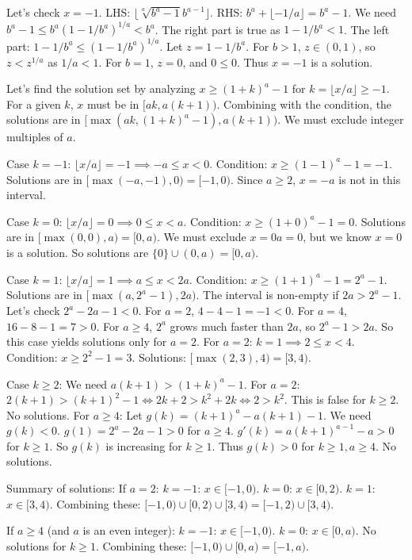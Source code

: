\documentclass[12pt,a4paper]{article}
\theoremstyle{definition}
\begin{document}
    Let's check $x=-1$. LHS: $\lfloor \sqrt[a]{b^a-1} b^{a-1} \rfloor$. RHS: $b^a+\lfloor-1/a\rfloor = b^a-1$.
    We need $b^a-1 \leq b^a(1-1/b^a)^{1/a} < b^a$. The right part is true as $1-1/b^a < 1$.
    The left part: $1-1/b^a \leq (1-1/b^a)^{1/a}$. Let $z=1-1/b^a$. For $b>1$, $z \in (0,1)$, so $z < z^{1/a}$ as $1/a < 1$. For $b=1$, $z=0$, and $0 \leq 0$. Thus $x=-1$ is a solution.

    Let's find the solution set by analyzing $x \geq (1+k)^a-1$ for $k=\lfloor x/a \rfloor \geq -1$.
    For a given $k$, $x$ must be in $[ak, a(k+1))$. Combining with the condition, the solutions are in $[\max(ak, (1+k)^a-1), a(k+1))$. We must exclude integer multiples of $a$.

    Case $k=-1$: $\lfloor x/a \rfloor = -1 \implies -a \leq x < 0$.
    Condition: $x \geq (1-1)^a-1 = -1$.
    Solutions are in $[\max(-a, -1), 0) = [-1,0)$. Since $a \geq 2$, $x=-a$ is not in this interval.

    Case $k=0$: $\lfloor x/a \rfloor = 0 \implies 0 \leq x < a$.
    Condition: $x \geq (1+0)^a-1 = 0$.
    Solutions are in $[\max(0,0), a) = [0,a)$. We must exclude $x=0a=0$, but we know $x=0$ is a solution. So solutions are $\{0\} \cup (0,a) = [0,a)$.

    Case $k=1$: $\lfloor x/a \rfloor = 1 \implies a \leq x < 2a$.
    Condition: $x \geq (1+1)^a-1 = 2^a-1$.
    Solutions are in $[\max(a, 2^a-1), 2a)$. The interval is non-empty if $2a > 2^a-1$.
    Let's check $2^a - 2a - 1 < 0$. For $a=2$, $4-4-1=-1<0$. For $a=4$, $16-8-1=7>0$. For $a \geq 4$, $2^a$ grows much faster than $2a$, so $2^a-1 > 2a$.
    So this case yields solutions only for $a=2$.
    For $a=2$: $k=1 \implies 2 \leq x < 4$. Condition: $x \geq 2^2-1=3$. Solutions: $[\max(2,3), 4) = [3,4)$.

    Case $k \geq 2$: We need $a(k+1) > (1+k)^a-1$.
    For $a=2$: $2(k+1) > (k+1)^2-1 \iff 2k+2 > k^2+2k \iff 2>k^2$. This is false for $k \geq 2$. No solutions.
    For $a \geq 4$: Let $g(k)=(k+1)^a - a(k+1) - 1$. We need $g(k)<0$.
    $g(1) = 2^a-2a-1 > 0$ for $a \geq 4$.
    $g'(k) = a(k+1)^{a-1}-a > 0$ for $k \geq 1$.
    So $g(k)$ is increasing for $k \geq 1$. Thus $g(k)>0$ for $k \geq 1, a \geq 4$. No solutions.

    Summary of solutions:
    If $a=2$:
    $k=-1$: $x \in [-1,0)$.
    $k=0$: $x \in [0,2)$.
    $k=1$: $x \in [3,4)$.
    Combining these: $[-1,0) \cup [0,2) \cup [3,4) = [-1,2) \cup [3,4)$.

    If $a \geq 4$ (and $a$ is an even integer):
    $k=-1$: $x \in [-1,0)$.
    $k=0$: $x \in [0,a)$.
    No solutions for $k \geq 1$.
    Combining these: $[-1,0) \cup [0,a) = [-1,a)$.
\end{document}

